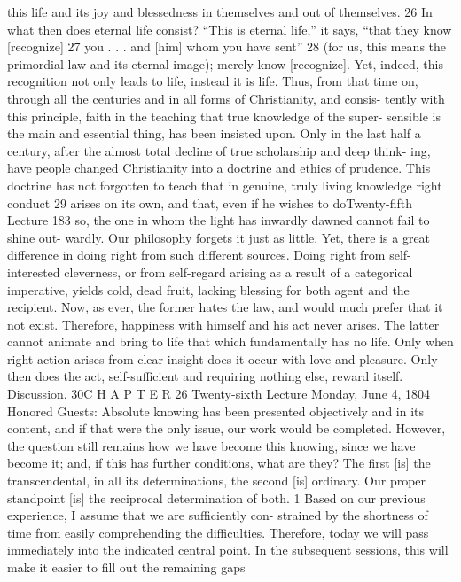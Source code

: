 this life and its joy and blessedness in themselves and out of themselves. 26
In what then does eternal life consist? “This is eternal life,” it says, “that
they know [recognize] 27 you . . . and [him] whom you have sent” 28 (for us, this
means the primordial law and its eternal image); merely know [recognize]. Yet,
indeed, this recognition not only leads to life, instead it is life. Thus, from that
time on, through all the centuries and in all forms of Christianity, and consis-
tently with this principle, faith in the teaching that true knowledge of the super-
sensible is the main and essential thing, has been insisted upon. Only in the last
half a century, after the almost total decline of true scholarship and deep think-
ing, have people changed Christianity into a doctrine and ethics of prudence.
This doctrine has not forgotten to teach that in genuine, truly living
knowledge right conduct 29 arises on its own, and that, even if he wishes to doTwenty-fifth Lecture
183
so, the one in whom the light has inwardly dawned cannot fail to shine out-
wardly. Our philosophy forgets it just as little. Yet, there is a great difference
in doing right from such different sources. Doing right from self-interested
cleverness, or from self-regard arising as a result of a categorical imperative,
yields cold, dead fruit, lacking blessing for both agent and the recipient. Now,
as ever, the former hates the law, and would much prefer that it not exist.
Therefore, happiness with himself and his act never arises. The latter cannot
animate and bring to life that which fundamentally has no life. Only when
right action arises from clear insight does it occur with love and pleasure. Only
then does the act, self-sufficient and requiring nothing else, reward itself.
Discussion. 30C H A P T E R
26
Twenty-sixth Lecture
Monday, June 4, 1804
Honored Guests:
Absolute knowing has been presented objectively and in its content, and if
that were the only issue, our work would be completed. However, the question
still remains how we have become this knowing, since we have become it; and,
if this has further conditions, what are they? The first [is] the transcendental,
in all its determinations, the second [is] ordinary. Our proper standpoint [is]
the reciprocal determination of both. 1
Based on our previous experience, I assume that we are sufficiently con-
strained by the shortness of time from easily comprehending the difficulties.
Therefore, today we will pass immediately into the indicated central point. In
the subsequent sessions, this will make it easier to fill out the remaining gaps
